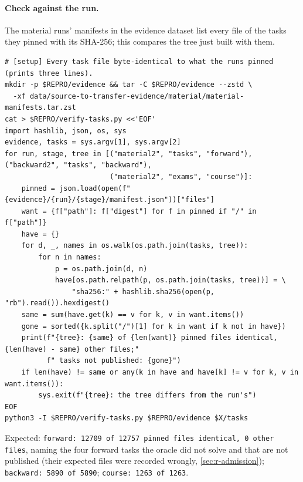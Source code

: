 \paragraph{Check against the run.}\label{app:repro-vim-verify}
The material runs' manifests in the evidence dataset list every file of the tasks they pinned with its SHA-256; this compares
the tree just built with them.

{\scriptsize
\begin{verbatim}
# [setup] Every task file byte-identical to what the runs pinned (prints three lines).
mkdir -p $REPRO/evidence && tar -C $REPRO/evidence --zstd \
  -xf data/source-to-transfer-evidence/material/material-manifests.tar.zst
cat > $REPRO/verify-tasks.py <<'EOF'
import hashlib, json, os, sys
evidence, tasks = sys.argv[1], sys.argv[2]
for run, stage, tree in [("material2", "tasks", "forward"), ("backward2", "tasks", "backward"),
                         ("material2", "exams", "course")]:
    pinned = json.load(open(f"{evidence}/{run}/{stage}/manifest.json"))["files"]
    want = {f["path"]: f["digest"] for f in pinned if "/" in f["path"]}
    have = {}
    for d, _, names in os.walk(os.path.join(tasks, tree)):
        for n in names:
            p = os.path.join(d, n)
            have[os.path.relpath(p, os.path.join(tasks, tree))] = \
                "sha256:" + hashlib.sha256(open(p, "rb").read()).hexdigest()
    same = sum(have.get(k) == v for k, v in want.items())
    gone = sorted({k.split("/")[1] for k in want if k not in have})
    print(f"{tree}: {same} of {len(want)} pinned files identical, {len(have) - same} other files;"
          f" tasks not published: {gone}")
    if len(have) != same or any(k in have and have[k] != v for k, v in want.items()):
        sys.exit(f"{tree}: the tree differs from the run's")
EOF
python3 -I $REPRO/verify-tasks.py $REPRO/evidence $X/tasks
\end{verbatim}
}

\begin{sloppypar}
Expected: \texttt{forward: 12709 of 12757 pinned files identical, 0 other files}, naming the four forward tasks the oracle
did not solve and that are not published (their expected files were recorded wrongly, \cref{sec:r-admission});
\texttt{backward: 5890 of 5890}; \texttt{course: 1263 of 1263}.
\end{sloppypar}

